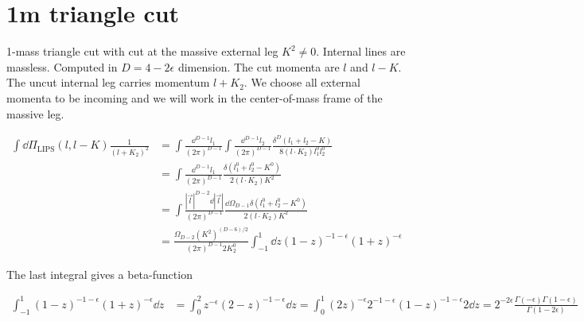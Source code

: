 \section{1m triangle cut}
1-mass triangle cut with cut at the massive external leg $K^2 \neq 0$.
Internal lines are massless. 
Computed in $D=4-2\epsilon$ dimension.
The cut momenta are $l$ and $l-K$.
The uncut internal leg carries momentum $l + K_2$. 
We choose all external momenta to be incoming and we will work in the center-of-mass frame of the massive leg.

\begin{equation*}
\begin{split}
\int\dd \Pi_{\textrm{LIPS}}(l, l-K) \frac{1}{(l+K_2)^2} & =
\int\frac{\dd^{D-1}l_1}{(2\pi)^{D-1}}\int\frac{\dd^{D-1}l_2}{(2\pi)^{D-1}}
\frac{\delta^{D}(l_1 + l_2 - K)}{8(l\cdot K_2)l_1^0 l_2^0}
\\
& = \int\frac{\dd^{D-1}l_1}{(2\pi)^{D-1}}\frac{\delta(l_1^0 + l_2^0 - K^0)}{2(l\cdot K_2)K^2} 
\\
& = \int\frac{|\vec{l}|^{D-2}\dd |\vec{l}|}{(2\pi)^{D-1}} \frac{\dd\Omega_{D-1}\delta(l_1^0 + l_2^0 - K^0)}{2 ( l \cdot K_2)K^2}
\\
& = \frac{\Omega_{D-2}(K^2)^{(D-6)/2}}{(2\pi)^{D-1}2K_2^0} \int_{-1}^1\dd z (1-z)^{-1-\epsilon}(1+z)^{-\epsilon}
\end{split} 
\end{equation*}

The last integral gives a beta-function

\begin{equation*}
\begin{split}
\int^1_{-1} (1-z)^{-1-\epsilon}(1+z)^{-\epsilon} \dd z & = 
\int^2_{0} z^{-\epsilon}(2-z)^{-1-\epsilon} \dd z 
=\int^1_0(2z)^{-\epsilon} 2^{-1-\epsilon} (1-z)^{-1-\epsilon} 2 \dd z
=2^{-2\epsilon}\frac{\Gamma(-\epsilon)\Gamma(1-\epsilon)}{\Gamma(1-2\epsilon)}
\end{split}
\end{equation*}